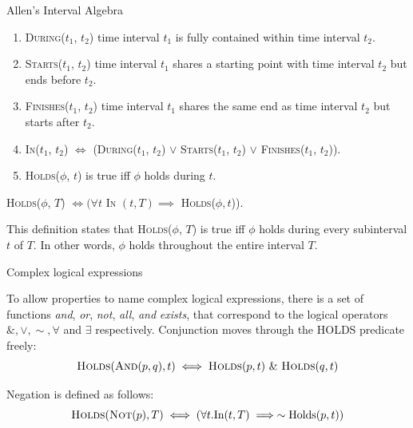 
\begin{exmp} Allen's Interval Algebra

	\begin{enumerate}
		\item \textsc{During}($t_1$, $t_2$) time interval $t_1$ is fully contained within time interval $t_2$.

		\item \textsc{Starts}($t_1$, $t_2$) time interval $t_1$ shares a starting point with time interval $t_2$ but ends before $t_2$.

		\item \textsc{Finishes}($t_1$, $t_2$) time interval $t_1$ shares the same end as time interval $t_2$ but starts after $t_2$.

		\item \textsc{In}($t_1$, $t_2$) $\iff$ (\textsc{During}($t_1$, $t_2$) $\lor$ \textsc{Starts}($t_1$, $t_2$) $\lor$ \textsc{Finishes}($t_1$, $t_2$)).

		\item \textsc{Holds}(\(\phi\), \(t\)) is true iff \(\phi\) holds during \(t\).
	\end{enumerate}



	\begin{center}
		\textsc{Holds}(\(\phi\), \(T\)) \(\iff ( \forall t \) \textsc{In} $ (t,T) \implies $ \textsc{Holds}($\phi, t$)).
	\end{center}

	This definition states that \textsc{Holds}($\phi$, $T$) is true iff $\phi$ holds during every subinterval $t$ of $T$. In other words, $\phi$ holds throughout the entire interval $T$.
\end{exmp}

\begin{exmp} Complex logical expressions

	To allow properties to name complex logical expressions, there is a set of
	functions \textit{and}, \textit{or}, \textit{not}, \textit{all}, \textit{and} \textit{exists}, that correspond to the logical operators
	$\&, \lor, \sim, \forall$ and $\exists$ respectively.
	Conjunction moves through the HOLDS predicate freely:
	\begin{equation}
		\textsc{Holds}(\textsc{And}(p, q), t) \iff \textsc{Holds}(p, t) \  \& \  \textsc{Holds}(q, t)
	\end{equation}

	Negation is defined as follows:
	\begin{equation}
		\textsc{Holds}(\textsc{Not}(p), T) \iff (\forall t.\text{In}(t, T) \implies \sim \text{Holds}(p, t))
	\end{equation}
\end{exmp}




